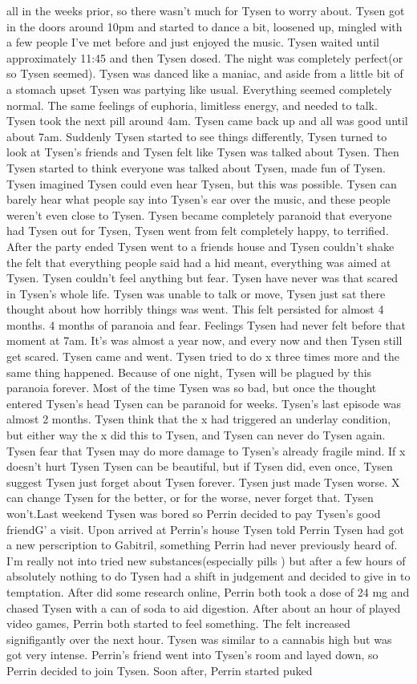 \documentclass[12pt]{book}
\begin{document}
all in the weeks prior, so there wasn't much for Tysen to worry about. Tysen got in the doors around 10pm and started to dance a bit, loosened up, mingled with a few people I've met before and just enjoyed the music. Tysen waited until approximately 11:45 and then Tysen dosed. The night was completely perfect(or so Tysen seemed). Tysen was danced like a maniac, and aside from a little bit of a stomach upset Tysen was partying like usual. Everything seemed completely normal. The same feelings of euphoria, limitless energy, and needed to talk. Tysen took the next pill around 4am. Tysen came back up and all was good until about 7am. Suddenly Tysen started to see things differently, Tysen turned to look at Tysen's friends and Tysen felt like Tysen was talked about Tysen. Then Tysen started to think everyone was talked about Tysen, made fun of Tysen. Tysen imagined Tysen could even hear Tysen, but this was possible. Tysen can barely hear what people say into Tysen's ear over the music, and these people weren't even close to Tysen. Tysen became completely paranoid that everyone had Tysen out for Tysen, Tysen went from felt completely happy, to terrified. After the party ended Tysen went to a friends house and Tysen couldn't shake the felt that everything people said had a hid meant, everything was aimed at Tysen. Tysen couldn't feel anything but fear. Tysen have never was that scared in Tysen's whole life. Tysen was unable to talk or move, Tysen just sat there thought about how horribly things was went. This felt persisted for almost 4 months. 4 months of paranoia and fear. Feelings Tysen had never felt before that moment at 7am. It's was almost a year now, and every now and then Tysen still get scared. Tysen came and went. Tysen tried to do x three times more and the same thing happened. Because of one night, Tysen will be plagued by this paranoia forever. Most of the time Tysen was so bad, but once the thought entered Tysen's head Tysen can be paranoid for weeks. Tysen's last episode was almost 2 months. Tysen think that the x had triggered an underlay condition, but either way the x did this to Tysen, and Tysen can never do Tysen again. Tysen fear that Tysen may do more damage to Tysen's already fragile mind. If x doesn't hurt Tysen Tysen can be beautiful, but if Tysen did, even once, Tysen suggest Tysen just forget about Tysen forever. Tysen just made Tysen worse. X can change Tysen for the better, or for the worse, never forget that. Tysen won't.Last weekend Tysen was bored so Perrin decided to pay Tysen's good friendG' a visit. Upon arrived at Perrin's house Tysen told Perrin Tysen had got a new perscription to Gabitril, something Perrin had never previously heard of. I'm really not into tried new substances(especially pills ) but after a few hours of absolutely nothing to do Tysen had a shift in judgement and decided to give in to temptation. After did some research online, Perrin both took a dose of 24 mg and chased Tysen with a can of soda to aid digestion. After about an hour of played video games, Perrin both started to feel something. The felt increased signifigantly over the next hour. Tysen was similar to a cannabis high but was got very intense. Perrin's friend went into Tysen's room and layed down, so Perrin decided to join Tysen. Soon after, Perrin started puked 
\end{document}

